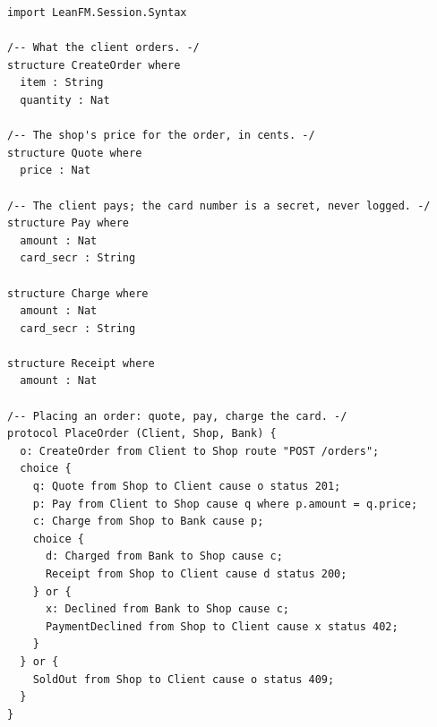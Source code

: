 \begin{lstlisting}[language={},basicstyle=\ttfamily\footnotesize,breaklines=true]
import LeanFM.Session.Syntax

/-- What the client orders. -/
structure CreateOrder where
  item : String
  quantity : Nat

/-- The shop's price for the order, in cents. -/
structure Quote where
  price : Nat

/-- The client pays; the card number is a secret, never logged. -/
structure Pay where
  amount : Nat
  card_secr : String

structure Charge where
  amount : Nat
  card_secr : String

structure Receipt where
  amount : Nat

/-- Placing an order: quote, pay, charge the card. -/
protocol PlaceOrder (Client, Shop, Bank) {
  o: CreateOrder from Client to Shop route "POST /orders";
  choice {
    q: Quote from Shop to Client cause o status 201;
    p: Pay from Client to Shop cause q where p.amount = q.price;
    c: Charge from Shop to Bank cause p;
    choice {
      d: Charged from Bank to Shop cause c;
      Receipt from Shop to Client cause d status 200;
    } or {
      x: Declined from Bank to Shop cause c;
      PaymentDeclined from Shop to Client cause x status 402;
    }
  } or {
    SoldOut from Shop to Client cause o status 409;
  }
}
\end{lstlisting}
